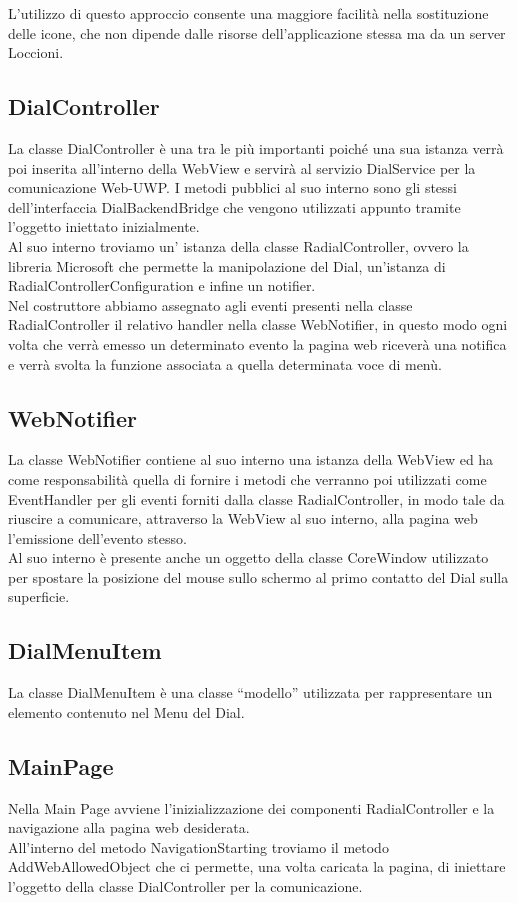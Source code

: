 L’utilizzo di questo approccio consente una maggiore facilità nella sostituzione delle icone, che non dipende dalle risorse dell’applicazione stessa ma da un server Loccioni.

\subsection{DialController}

La classe DialController è una tra le più importanti poiché una sua istanza verrà poi inserita all’interno della WebView e servirà al servizio DialService per la comunicazione Web-UWP. I metodi pubblici al suo interno sono gli stessi dell’interfaccia DialBackendBridge che vengono utilizzati appunto tramite l’oggetto iniettato inizialmente.\\

Al suo interno troviamo un’ istanza della classe RadialController, ovvero la libreria Microsoft che permette la manipolazione del Dial, un'istanza di RadialControllerConfiguration e infine un notifier.\\

Nel costruttore abbiamo assegnato agli eventi presenti nella classe RadialController il relativo handler nella classe WebNotifier, in questo modo ogni volta che verrà emesso un determinato evento la pagina web riceverà una notifica e verrà svolta la funzione associata a quella determinata voce di menù.

\subsection{WebNotifier}

La classe WebNotifier contiene al suo interno una istanza della WebView ed ha come responsabilità quella di fornire i metodi che verranno poi utilizzati come EventHandler per gli eventi forniti dalla classe RadialController, in modo tale da riuscire a comunicare, attraverso la WebView al suo interno, alla pagina web l’emissione dell’evento stesso.\\

Al suo interno è presente anche un oggetto della classe CoreWindow utilizzato per spostare la posizione del mouse sullo schermo al primo contatto del Dial sulla superficie.

\subsection{DialMenuItem}

La classe DialMenuItem è una classe “modello” utilizzata per rappresentare un elemento contenuto nel Menu del Dial.

\subsection{MainPage}

Nella Main Page avviene l’inizializzazione dei componenti RadialController e la navigazione alla pagina web desiderata.\\

All’interno del metodo NavigationStarting troviamo il metodo AddWebAllowedObject che ci permette, una volta caricata la pagina, di iniettare l’oggetto della classe DialController per la comunicazione.